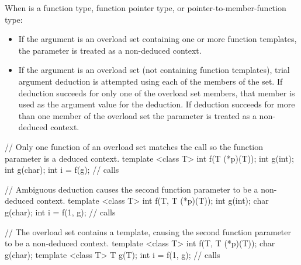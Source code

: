 \pnum
When
is a function type, function pointer type, or pointer-to-member-function type:
\begin{itemize}
\item
If the argument is an overload set containing one or more function templates,
the parameter is treated as a non-deduced context.
\item
If the argument is an overload set (not containing function templates), trial
argument deduction is attempted using each of the members of the set. If
deduction succeeds for only one of the overload set members, that member is
used as the argument value for the deduction. If deduction succeeds for more than
one member of the overload set the parameter is treated as a non-deduced context.
\end{itemize}

\pnum
\begin{example}
\begin{codeblock}
// Only one function of an overload set matches the call so the function parameter is a deduced context.
template <class T> int f(T (*p)(T));
int g(int);
int g(char);
int i = f(g);       // calls 
\end{codeblock}
\end{example}

\pnum
\begin{example}
\begin{codeblock}
// Ambiguous deduction causes the second function parameter to be a non-deduced context.
template <class T> int f(T, T (*p)(T));
int g(int);
char g(char);
int i = f(1, g);    // calls 
\end{codeblock}
\end{example}

\pnum
\begin{example}
\begin{codeblock}
// The overload set contains a template, causing the second function parameter to be a non-deduced context.
template <class T> int f(T, T (*p)(T));
char g(char);
template <class T> T g(T);
int i = f(1, g);    // calls 
\end{codeblock}
\end{example}

